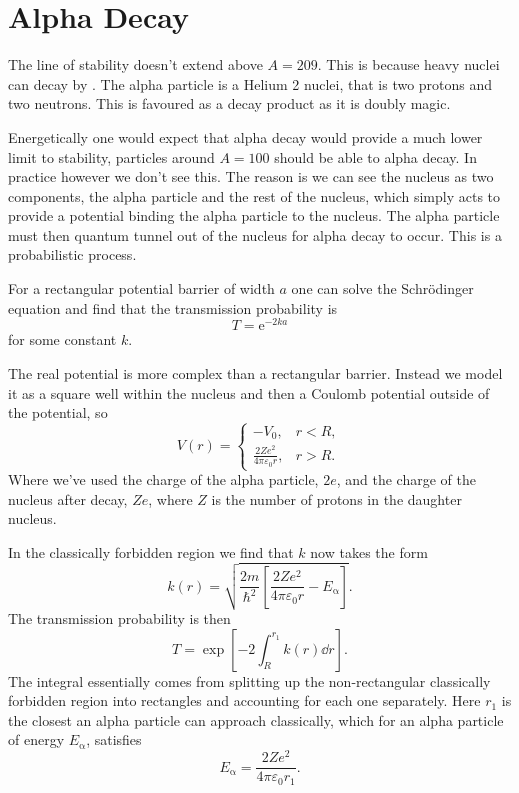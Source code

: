 \documentclass[fleqn]{NotesClass}
\newcommand*{\Palpha}{\ensuremath{\upalpha}}
\newcommand{\e}{\mathrm{e}}
\begin{document}
    \chapter{Alpha Decay}
    The line of stability doesn't extend above \(A = 209\).
    This is because heavy nuclei can decay by .
    The alpha particle is a Helium 2 nuclei, that is two protons and two neutrons.
    This is favoured as a decay product as it is doubly magic.
    
    Energetically one would expect that alpha decay would provide a much lower limit to stability, particles around \(A = 100\) should be able to alpha decay.
    In practice however we don't see this.
    The reason is we can see the nucleus as two components, the alpha particle and the rest of the nucleus, which simply acts to provide a potential binding the alpha particle to the nucleus.
    The alpha particle must then quantum tunnel out of the nucleus for alpha decay to occur.
    This is a probabilistic process.
    
    For a rectangular potential barrier of width \(a\) one can solve the Schr\"odinger equation and find that the transmission probability is
    \begin{equation}
        T = \e^{-2ka}
    \end{equation}
    for some constant \(k\).
    
    The real potential is more complex than a rectangular barrier.
    Instead we model it as a square well within the nucleus and then a Coulomb potential outside of the potential, so
    \begin{equation}
        V(r) = 
        \begin{cases}
            -V_0, & r < R,\\
            \frac{2Ze^2}{4\pi\varepsilon_0r}, & r > R.
        \end{cases}
    \end{equation}
    Where we've used the charge of the alpha particle, \(2e\), and the charge of the nucleus after decay, \(Ze\), where \(Z\) is the number of protons in the daughter nucleus.
    
    In the classically forbidden region we find that \(k\) now takes the form
    \begin{equation}
        k(r) = \sqrt{\frac{2m}{\hbar^2} \left[ \frac{2Ze^2}{4\pi\varepsilon_0r} - E_{\Palpha} \right]}.
    \end{equation}
    The transmission probability is then
    \begin{equation}
        T = \exp\left[ -2\int_{R}^{r_1} k(r) \dd{r} \right].
    \end{equation}
    The integral essentially comes from splitting up the non-rectangular classically forbidden region into rectangles and accounting for each one separately.
    Here \(r_1\) is the closest an alpha particle can approach classically, which for an alpha particle of energy \(E_{\Palpha}\), satisfies
    \begin{equation}
        E_{\Palpha} = \frac{2Ze^2}{4\pi\varepsilon_0r_1}.
    \end{equation}
    
\end{document}
